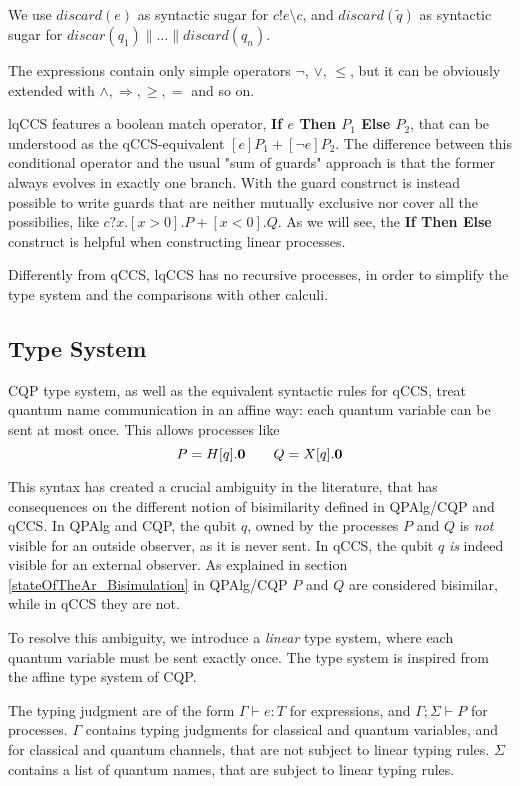 We use $discard(e)$ as syntactic sugar for $c!e \setminus c$, and $discard(\widetilde{q})$ as syntactic sugar for $discar(q_1)\parallel \ldots\parallel discard(q_n)$.

The expressions contain only simple operators $\neg$, $\vee$, $\leq$, but it can be obviously extended with $\wedge, \Rightarrow, \geq, =$ and so on.

lqCCS features a boolean match operator, \textbf{If $e$ Then $P_1$ Else $P_2$}, that can be understood as the qCCS-equivalent $[e]P_1 + [\neg e]P_2$. The difference between this conditional operator and the usual "sum of guards" approach is that the former always evolves in exactly one branch. With the guard construct is instead possible to write guards that are neither mutually exclusive nor cover all the possibilies, like $c?x.[x > 0].P + [x < 0].Q$. As we will see, the  \textbf{If Then Else} construct is helpful when constructing linear processes.

Differently from qCCS, lqCCS has no recursive processes, in order to simplify the type system and the comparisons with other calculi.


\subsection{Type System}

CQP type system, as well as the equivalent syntactic rules for qCCS, treat quantum name communication in an affine way: each quantum variable can be sent at most once. This allows processes like 
\[ P = H[q].\mathbf{0} \qquad Q = X[q].\mathbf{0}\]

This syntax has created a crucial ambiguity in the literature, that has consequences on the different notion of bisimilarity defined in QPAlg/CQP and qCCS. In QPAlg and CQP, the qubit $q$, owned by the processes $P$ and $Q$ is \textit{not} visible for an outside observer, as it is never sent. In qCCS, the qubit $q$ \textit{is} indeed visible for an external observer. As explained in section \ref{stateOfTheAr_Bisimulation} in QPAlg/CQP $P$ and $Q$ are considered bisimilar, while in qCCS they are not.

To resolve this ambiguity, we introduce a \textit{linear} type system, where each quantum variable must be sent exactly once. The type system is inspired from the affine type system of CQP. 

The typing judgment are of the form $\Gamma \vdash e : T$ for expressions, and $\Gamma; \Sigma \vdash P$ for processes. $\Gamma$ contains typing judgments for classical and quantum variables, and for classical and quantum channels, that are not subject to linear typing rules. $\Sigma$ contains a list of quantum names, that are subject to linear typing rules.

